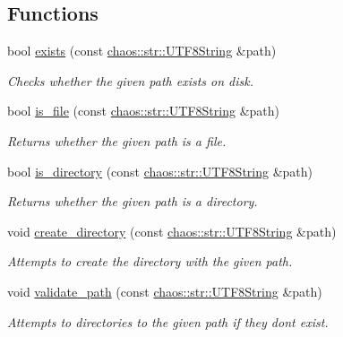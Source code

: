\subsection*{Functions}
\begin{DoxyCompactItemize}
\item 
bool \hyperlink{namespacechaos_1_1io_1_1file_a61827a50efb6151300a110df0551e21e}{exists} (const \hyperlink{classchaos_1_1str_1_1_u_t_f8_string}{chaos\+::str\+::\+U\+T\+F8\+String} \&path)
\begin{DoxyCompactList}\small\item\em Checks whether the given path exists on disk. \end{DoxyCompactList}\item 
bool \hyperlink{namespacechaos_1_1io_1_1file_a654dba5a0f9ac90c667f7dc235e10f2c}{is\+\_\+file} (const \hyperlink{classchaos_1_1str_1_1_u_t_f8_string}{chaos\+::str\+::\+U\+T\+F8\+String} \&path)
\begin{DoxyCompactList}\small\item\em Returns whether the given path is a file. \end{DoxyCompactList}\item 
bool \hyperlink{namespacechaos_1_1io_1_1file_aeb4d9f84e6fddbe1015c8a30b58b3a6c}{is\+\_\+directory} (const \hyperlink{classchaos_1_1str_1_1_u_t_f8_string}{chaos\+::str\+::\+U\+T\+F8\+String} \&path)
\begin{DoxyCompactList}\small\item\em Returns whether the given path is a directory. \end{DoxyCompactList}\item 
\hypertarget{namespacechaos_1_1io_1_1file_afedb17553b2e87582d10304e2f7a5b5a}{}void \hyperlink{namespacechaos_1_1io_1_1file_afedb17553b2e87582d10304e2f7a5b5a}{create\+\_\+directory} (const \hyperlink{classchaos_1_1str_1_1_u_t_f8_string}{chaos\+::str\+::\+U\+T\+F8\+String} \&path)\label{namespacechaos_1_1io_1_1file_afedb17553b2e87582d10304e2f7a5b5a}

\begin{DoxyCompactList}\small\item\em Attempts to create the directory with the given path. \end{DoxyCompactList}\item 
void \hyperlink{namespacechaos_1_1io_1_1file_a81859724aba8453eb17a10e0b843e5ff}{validate\+\_\+path} (const \hyperlink{classchaos_1_1str_1_1_u_t_f8_string}{chaos\+::str\+::\+U\+T\+F8\+String} \&path)
\begin{DoxyCompactList}\small\item\em Attempts to directories to the given path if they don\textquotesingle{}t exist. \end{DoxyCompactList}\end{DoxyCompactItemize}


